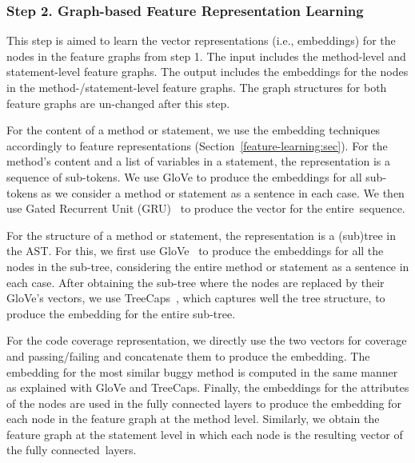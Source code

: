 \subsubsection{{\bf Step 2. Graph-based Feature Representation
  Learning}}

This step is aimed to learn the vector representations (i.e.,
embeddings) for the nodes in the feature graphs from step 1. The input
includes the method-level and statement-level feature graphs. The
output includes the embeddings for the nodes in the
method-/statement-level feature graphs. The graph structures for both
feature graphs are un-changed after this step.

For the content of a method or statement, we use the
embedding techniques accordingly to feature representations
(Section~\ref{feature-learning:sec}). For the method's content and a
list of variables in a statement, the representation is a sequence of
sub-tokens. We use GloVe \cite{glove2014} to produce the embeddings
for all sub-tokens as we consider a method or statement as a sentence
in each case. We then use Gated Recurrent Unit (GRU)~\cite{GRU-cho14}
to produce the vector for the entire~sequence.

For the structure of a method or statement, the representation is a
(sub)tree in the AST. For this, we first use GloVe~\cite{glove2014} to
produce the embeddings for all the nodes in the sub-tree, considering
the entire method or statement as a sentence in each case. After
obtaining the sub-tree where the nodes are replaced by their GloVe's
vectors, we use TreeCaps~\cite{bui2021treecaps}, which captures well
the tree structure, to produce the embedding for the entire sub-tree.

For the code coverage representation, we directly use the two vectors
for coverage and passing/failing and concatenate them to produce the
embedding. The embedding for the most similar buggy method is computed
in the same manner as explained with GloVe and TreeCaps. Finally, the
embeddings for the attributes of the nodes are used in the fully
connected layers to produce the embedding for each node in the feature
graph at the method level. Similarly, we obtain the feature graph at
the statement level in which each node is the resulting vector of the
fully connected~layers.

